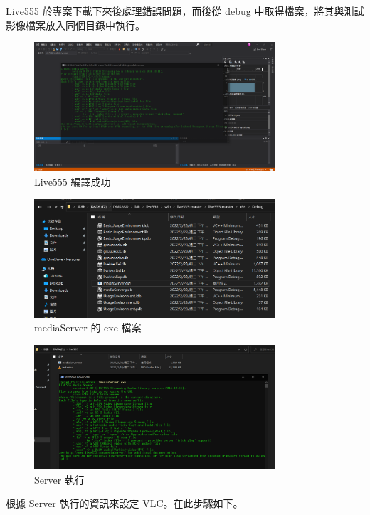 \documentclass[10pt,UTF8]{ctexart}
\begin{document}
Live555 於專案下載下來後處理錯誤問題，而後從 debug 中取得檔案，將其與測試影像檔案放入同個目錄中執行。

\begin{figure}[H]
\centering 
\includegraphics[width=0.80\textwidth]{4.png} 
\caption{Live555 編譯成功}
\label{Test}
\end{figure}

\begin{figure}[H]
\centering 
\includegraphics[width=0.80\textwidth]{5.png} 
\caption{mediaServer 的 exe 檔案}
\label{Test}
\end{figure}

\begin{figure}[H]
\centering 
\includegraphics[width=0.80\textwidth]{6.png} 
\caption{Server 執行}
\label{Test}
\end{figure}

根據 Server 執行的資訊來設定 VLC。在此步驟如下。
\end{document}
